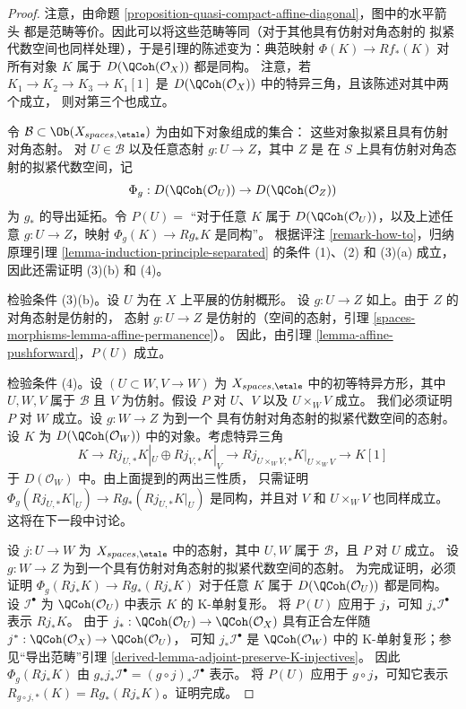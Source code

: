 \begin{proof}
注意，由命题
\ref{proposition-quasi-compact-affine-diagonal}，图中的水平箭头
都是范畴等价。因此可以将这些范畴等同（对于其他具有仿射对角态射的
拟紧代数空间也同样处理），于是引理的陈述变为：典范映射
$\Phi(K) \to Rf_*(K)$ 对所有对象 $K$ 属于
$D(\QCoh(\mathcal{O}_X))$ 都是同构。
注意，若
$K_1 \to K_2 \to K_3 \to K_1[1]$
是 $D(\QCoh(\mathcal{O}_X))$ 中的特异三角，且该陈述对其中两个成立，
则对第三个也成立。

\medskip\noindent
令 $\mathcal{B} \subset \Ob(X_{spaces, \etale})$ 为由如下对象组成的集合：
这些对象拟紧且具有仿射对角态射。
对 $U \in \mathcal{B}$ 以及任意态射 $g : U \to Z$，其中 $Z$ 是
在 $S$ 上具有仿射对角态射的拟紧代数空间，记
$$
\Phi_g : D(\QCoh(\mathcal{O}_U)) \to D(\QCoh(\mathcal{O}_Z))
$$
为 $g_*$ 的导出延拓。令
$P(U) =$ “对于任意 $K$ 属于 $D(\QCoh(\mathcal{O}_U))$，以及上述任意
$g : U \to Z$，映射 $\Phi_g(K) \to Rg_*K$ 是同构”。
根据评注 \ref{remark-how-to}，归纳原理引理
\ref{lemma-induction-principle-separated} 的条件 (1)、(2) 和 (3)(a)
成立，因此还需证明 (3)(b) 和 (4)。

\medskip\noindent
检验条件 (3)(b)。设 $U$ 为在 $X$ 上平展的仿射概形。
设 $g : U \to Z$ 如上。由于 $Z$ 的对角态射是仿射的，
态射 $g : U \to Z$ 是仿射的（空间的态射，引理
\ref{spaces-morphisms-lemma-affine-permanence}）。
因此，由引理 \ref{lemma-affine-pushforward}，$P(U)$ 成立。

\medskip\noindent
检验条件 (4)。设 $(U \subset W, V \to W)$ 为
$X_{spaces, \etale}$ 中的初等特异方形，其中 $U, W, V$ 属于
$\mathcal{B}$ 且 $V$ 为仿射。假设 $P$ 对 $U$、$V$ 以及
$U \times_W V$ 成立。
我们必须证明 $P$ 对 $W$ 成立。设 $g : W \to Z$ 为到一个
具有仿射对角态射的拟紧代数空间的态射。
设 $K$ 为 $D(\QCoh(\mathcal{O}_W))$ 中的对象。考虑特异三角
$$
K \to Rj_{U, *}K|_U \oplus Rj_{V, *}K|_V \to
Rj_{U \times_W V, *}K|_{U \times_W V} \to K[1]
$$
于 $D(\mathcal{O}_W)$ 中。由上面提到的两出三性质，
只需证明
$\Phi_g(Rj_{U, *}K|_U) \to Rg_*(Rj_{U, *}K|_U)$
是同构，并且对 $V$ 和 $U \times_W V$ 也同样成立。
这将在下一段中讨论。

\medskip\noindent
设 $j : U \to W$ 为 $X_{spaces, \etale}$ 中的态射，其中
$U, W$ 属于 $\mathcal{B}$，且 $P$ 对 $U$ 成立。 %
设 $g : W \to Z$ 为到一个具有仿射对角态射的拟紧代数空间的态射。
为完成证明，必须证明
$\Phi_g(Rj_*K) \to Rg_*(Rj_*K)$
对于任意 $K$ 属于 $D(\QCoh(\mathcal{O}_U))$ 都是同构。
设 $\mathcal{I}^\bullet$ 为 $\QCoh(\mathcal{O}_U)$ 中表示 $K$ 的
K-单射复形。
将 $P(U)$ 应用于 $j$，可知
$j_*\mathcal{I}^\bullet$ 表示 $Rj_*K$。
由于
$j_* : \QCoh(\mathcal{O}_U) \to \QCoh(\mathcal{O}_X)$
具有正合左伴随
$j^* : \QCoh(\mathcal{O}_X) \to \QCoh(\mathcal{O}_U)$， %
可知 $j_*\mathcal{I}^\bullet$ 是
$\QCoh(\mathcal{O}_W)$ 中的 K-单射复形；参见“导出范畴”引理
\ref{derived-lemma-adjoint-preserve-K-injectives}。
因此 $\Phi_g(Rj_*K)$ 由
$g_*j_*\mathcal{I}^\bullet = (g \circ j)_*\mathcal{I}^\bullet$ 表示。
将 $P(U)$ 应用于 $g \circ j$，可知它表示
$R_{g \circ j, *}(K) = Rg_*(Rj_*K)$。证明完成。
\end{proof}

